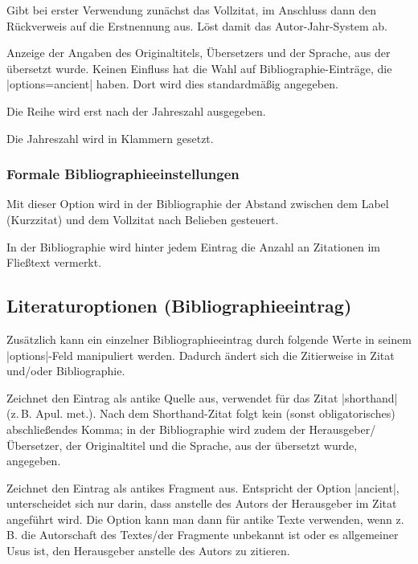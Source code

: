 \documentclass[a4paper,10pt,ngerman]{ltxdoc}
\begin{document}
  Gibt bei erster Verwendung zunächst das Vollzitat, im Anschluss dann den Rückverweis auf die Erstnennung aus. Löst damit das Autor-Jahr-System ab. 

  Anzeige der Angaben des Originaltitels, Übersetzers und der Sprache, aus der übersetzt wurde. 
Keinen Einfluss hat die Wahl auf Bibliographie-Einträge, die |options=ancient| haben. 
Dort wird dies standardmäßig angegeben.

  Die Reihe wird erst nach der Jahreszahl ausgegeben.
 
  Die Jahreszahl wird in Klammern gesetzt.

\subsubsection{Formale Bibliographieeinstellungen}

  Mit dieser Option wird in der Bibliographie der Abstand zwischen dem Label (Kurzzitat) und dem Vollzitat nach Belieben gesteuert.
 
  In der Bibliographie wird hinter jedem Eintrag die Anzahl an Zitationen im Fließtext vermerkt. 

\subsection{Literaturoptionen (Bibliographieeintrag)}\label{bib_options}
Zusätzlich kann ein einzelner Bibliographieeintrag durch folgende Werte in seinem |options|-Feld manipuliert werden. Dadurch ändert sich die Zitierweise in Zitat und/oder Bibliographie.

  Zeichnet den Eintrag als antike Quelle aus, verwendet für das Zitat |shorthand| (z.\,B. Apul. met.). Nach dem Shorthand-Zitat folgt kein (sonst obligatorisches) abschließendes Komma; in der Bibliographie wird zudem der Herausgeber/Übersetzer, der Originaltitel und die Sprache, aus der übersetzt wurde, angegeben.

  Zeichnet den Eintrag als antikes Fragment aus. Entspricht der Option |ancient|, unterscheidet sich nur darin, dass anstelle des Autors der Herausgeber im Zitat angeführt wird. Die Option kann man dann für antike Texte verwenden, wenn z.\,B. die Autorschaft des Textes/der Fragmente unbekannt ist oder es allgemeiner Usus ist, den Herausgeber anstelle des Autors zu zitieren.
\end{document}
